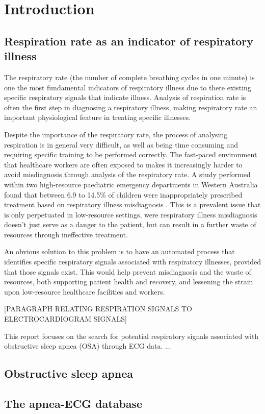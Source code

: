 \chapter{Introduction}\label{ch:introduction}

\section{Respiration rate as an indicator of respiratory illness}\label{sec:resp-intro}

The respiratory rate (the number of complete breathing cycles in one minute) is one the most fundamental indicators of respiratory illness due to there existing specific respiratory signals that indicate illness. Analysis of respiration rate is often the first step in diagnosing a respiratory illness, making respiratory rate an important physiological feature in treating specific illnesses.

Despite the importance of the respiratory rate, the process of analysing respiration is in general very difficult, as well as being time consuming and requiring specific training to be performed correctly. The fast-paced environment that healthcare workers are often exposed to makes it increasingly harder to avoid misdiagnosis through analysis of the respiratory rate. A study performed within two high-resource paediatric emergency departments in Western Australia found that between 6.9 to 14.5\% of children were inappropriately prescribed treatment based on respiratory illness misdiagnosis \cite{misdiagnosis-high-resource-ER}. This is a prevalent issue that is only perpetuated in low-resource settings, were respiratory illness misdiagnosis doesn't just serve as a danger to the patient, but can result in a further waste of resources through ineffective treatment.

An obvious solution to this problem is to have an automated process that identifies specific respiratory signals associated with respiratory illnesses, provided that those signals exist. This would help prevent misdiagnosis and the waste of resources, both supporting patient health and recovery, and lessening the strain upon low-resource healthcare facilities and workers.

[PARAGRAPH RELATING RESPIRATION SIGNALS TO ELECTROCARDIOGRAM SIGNALS]

This report focuses on the search for potential respiratory signals associated with obstructive sleep apnea (OSA) through ECG data. ...

\section{Obstructive sleep apnea}\label{sec:sleep-apnea}



\section{The apnea-ECG database}\label{sec:database}

